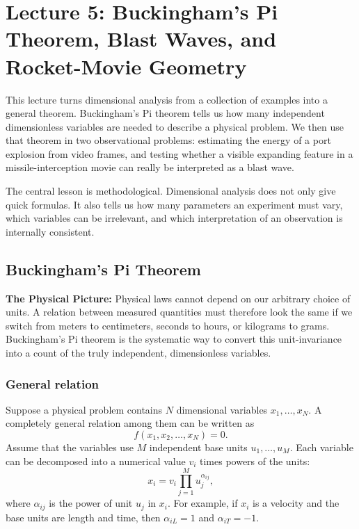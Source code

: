 \section{Lecture 5: Buckingham's Pi Theorem, Blast Waves, and Rocket-Movie Geometry}
\label{sec:lec05}
\date{07/05/2026}

This lecture turns dimensional analysis from a collection of examples into a
general theorem. Buckingham's Pi theorem tells us how many independent
dimensionless variables are needed to describe a physical problem. We then use
that theorem in two observational problems: estimating the energy of a port
explosion from video frames, and testing whether a visible expanding feature in
a missile-interception movie can really be interpreted as a blast wave.

The central lesson is methodological. Dimensional analysis does not only give
quick formulas. It also tells us how many parameters an experiment must vary,
which variables can be irrelevant, and which interpretation of an observation
is internally consistent.

\subsection{Buckingham's Pi Theorem}
\label{sec:lec05:buckingham}

\textbf{The Physical Picture:}
Physical laws cannot depend on our arbitrary choice of units. A relation
between measured quantities must therefore look the same if we switch from
meters to centimeters, seconds to hours, or kilograms to grams. Buckingham's
Pi theorem is the systematic way to convert this unit-invariance into a count
of the truly independent, dimensionless variables.

\subsubsection*{General relation}
Suppose a physical problem contains $N$ dimensional variables
$x_1,\ldots,x_N$. A completely general relation among them can be written as
\begin{equation}
    f(x_1,x_2,\ldots,x_N)=0 .
    \label{eq:lec05:general-relation}
\end{equation}
Assume that the variables use $M$ independent base units
$u_1,\ldots,u_M$. Each variable can be decomposed into a numerical value $v_i$
times powers of the units:
\begin{equation}
    x_i = v_i \prod_{j=1}^{M} u_j^{\alpha_{ij}},
    \label{eq:lec05:unit-decomposition}
\end{equation}
where $\alpha_{ij}$ is the power of unit $u_j$ in $x_i$. For example, if $x_i$
is a velocity and the base units are length and time, then $\alpha_{iL}=1$ and
$\alpha_{iT}=-1$.

